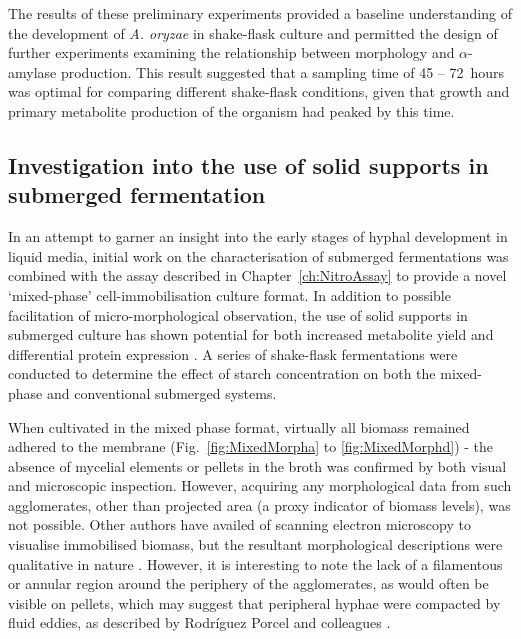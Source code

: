 The results of these preliminary experiments provided a baseline understanding of the development of \emph{A. oryzae} in shake-flask culture and permitted the design of further experiments examining the relationship between morphology and $\alpha$-amylase production. This result suggested that a sampling time of 45 -- 72~hours was optimal for comparing different shake-flask conditions, given that growth and primary metabolite production of the organism had peaked by this time.

\subsection{Investigation into the use of solid supports in submerged fermentation}

In an attempt to garner an insight into the early stages of hyphal development in liquid media, initial work on the characterisation of submerged fermentations was combined with the assay described in Chapter~\ref{ch:NitroAssay} to provide a novel \lq mixed-phase' cell-immobilisation culture format. In addition to possible facilitation of micro-morphological observation, the use of solid supports in submerged culture has shown potential for both increased metabolite yield \cite{papagianni2004} and differential protein expression \cite{bigelis2006}. A series of shake-flask fermentations were conducted to determine the effect of starch concentration on both the mixed-phase and conventional submerged systems.

When cultivated in the mixed phase format, virtually all biomass remained adhered to the membrane (Fig.~\ref{fig:MixedMorpha} to \ref{fig:MixedMorphd}) - the absence of mycelial elements or pellets in the broth was confirmed by both visual and microscopic inspection. However, acquiring any morphological data from such agglomerates, other than projected area (a proxy indicator of biomass levels), was not possible. Other authors have availed of scanning electron microscopy to visualise immobilised biomass, but the resultant morphological descriptions were qualitative in nature \cite{papagianni2004}. However, it is interesting to note the lack of a filamentous or annular region around the periphery of the agglomerates, as would often be visible on pellets, which may suggest that peripheral hyphae were compacted by fluid eddies, as described by Rodr\'{i}guez Porcel and colleagues \cite{rodriguezporcel2005}.

